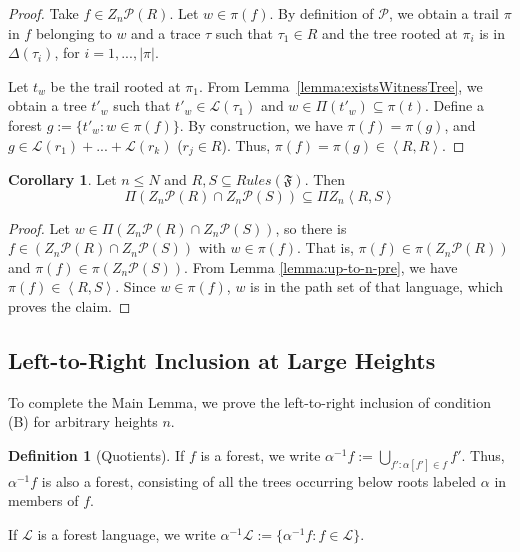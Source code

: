 \documentclass[sigplan,9pt]{acmart}\settopmatter{printfolios=true,printccs=false,printacmref=false}
\newcounter{thm}
\newcounter{theorem}
\theoremstyle{definition}
\newtheorem{defin}[thm]{Definition}
\newtheorem{corollary}[thm]{Corollary}
\newcommand{\La}[0]{{\mathcal{L}}}
\newcommand{\Ff}[0]{{\mathfrak{F}}}
\newcommand{\Pa}[0]{{\mathcal{P}}}
\newcommand{\Rn}[0]{Z_n}
\begin{document}
\begin{proof}
Take $f \in Z_n \Pa(R)$.
Let $w \in \pi(f)$.
By definition of $\Pa$, we obtain a trail $\pi$ in $f$ belonging to $w$ and a trace $\tau$ such that $\tau_1 \in R$ and the tree rooted at $\pi_i$ is in $\Delta(\tau_i)$, for $i = 1, ..., |\pi|$.

Let $t_w$ be the trail rooted at $\pi_1$.
From Lemma~\ref{lemma:existsWitnessTree}, we obtain a tree $t'_w$ such that $t'_w \in \La(\tau_1)$ and $w \in \Pi(t'_w) \subseteq \pi(t)$.
Define a forest $g := \{t'_w : w \in \pi(f)\}$.
By construction, we have $\pi(f) = \pi(g)$, and $g \in \La(r_1) + ... + \La(r_k)$ ($r_j \in R$).
Thus, $\pi(f) = \pi(g) \in \left\langle R, R\right\rangle$.
\end{proof}


\begin{corollary}\label{lemma:up-to-n}
Let $n \leq N$ and $R,S \subseteq Rules(\Ff)$. Then
$$\Pi  (\Rn\Pa(R) \cap \Rn\Pa(S)) \subseteq \Pi \Rn \left\langle R, S\right\rangle$$
\end{corollary}

\begin{proof}
Let $w \in \Pi  (\Rn\Pa(R) \cap \Rn\Pa(S))$,
so there is $f \in (\Rn\Pa(R) \cap \Rn\Pa(S))$ with $w \in \pi(f)$.
That is, $\pi(f) \in \pi(\Rn\Pa(R))$ and $\pi(f) \in \pi(\Rn\Pa(S))$.
From Lemma \ref{lemma:up-to-n-pre}, we have $\pi(f) \in \left\langle R, S\right\rangle$.
Since $w \in \pi(f)$, $w$ is in the path set of that language, which proves the claim.
\end{proof}







\subsection{Left-to-Right Inclusion at Large Heights}

To complete the Main Lemma, we prove the left-to-right inclusion of condition (B) for arbitrary heights $n$.


\begin{defin}[Quotients]\label{def:quotient}
If $f$ is a forest, we write $\alpha^{-1}f := \bigcup_{f' : \alpha[f'] \in f} f'$.
Thus, $\alpha^{-1}f$ is also a forest, consisting of all the trees occurring below roots labeled $\alpha$ in members of $f$.

If $\La$ is a forest language, we write $\alpha^{-1}\La := \{\alpha^{-1}f : f \in \La\}$.
\end{defin}
\end{document}
